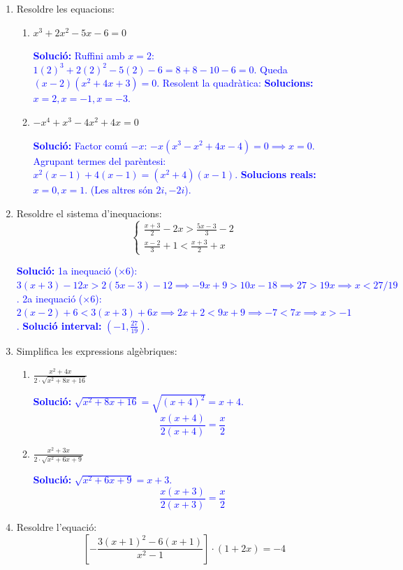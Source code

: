 \documentclass[12pt,a4paper]{article}
\newcommand{\solucio}[1]{%
    \par\vspace{5pt}\noindent\textcolor{blue}{\textbf{Solució:} #1}\par\vspace{10pt}%
}
\begin{document}
\begin{enumerate}[label=\textbf{\arabic*.}]
    \item Resoldre les equacions:
    \begin{enumerate}[label=\alph*)]
        \item $x^{3}+2x^{2}-5x-6=0$
        \solucio{
        Ruffini amb $x=2$: $1(2)^3 + 2(2)^2 - 5(2) - 6 = 8+8-10-6=0$.
        Queda $(x-2)(x^2+4x+3)=0$. Resolent la quadràtica:
        \textbf{Solucions:} $x=2, x=-1, x=-3$.
        }
        
        \item $-x^{4}+x^{3}-4x^{2}+4x=0$
        \solucio{
        Factor comú $-x$: $-x(x^3 - x^2 + 4x - 4) = 0 \implies x=0$.
        Agrupant termes del parèntesi: $x^2(x-1) + 4(x-1) = (x^2+4)(x-1)$.
        \textbf{Solucions reals:} $x=0, x=1$. (Les altres són $2i, -2i$).
        }
    \end{enumerate}

    \item Resoldre el sistema d'inequacions:
    \[ \begin{cases} \frac{x+3}{2}-2x > \frac{5x-3}{3}-2 \\ \frac{x-2}{3}+1 < \frac{x+3}{2}+x \end{cases} \]
    
    \solucio{
    1a inequació ($\times 6$): $3(x+3) - 12x > 2(5x-3) - 12 \implies -9x + 9 > 10x - 18 \implies 27 > 19x \implies x < 27/19$.
    \newline
    2a inequació ($\times 6$): $2(x-2) + 6 < 3(x+3) + 6x \implies 2x + 2 < 9x + 9 \implies -7 < 7x \implies x > -1$.
    \textbf{Solució interval:} $(-1, \frac{27}{19})$.
    }

    \item Simplifica les expressions algèbriques:
    \begin{enumerate}[label=\alph*)]
        \item $\displaystyle \frac{x^{2}+4x}{2\cdot\sqrt{x^{2}+8x+16}}$
        \solucio{
        $\sqrt{x^2+8x+16} = \sqrt{(x+4)^2} = x+4$.
        \[ \frac{x(x+4)}{2(x+4)} = \boxed{\frac{x}{2}} \]
        }

        \item $\displaystyle \frac{x^{2}+3x}{2\cdot\sqrt{x^{2}+6x+9}}$
        \solucio{
        $\sqrt{x^2+6x+9} = x+3$.
        \[ \frac{x(x+3)}{2(x+3)} = \boxed{\frac{x}{2}} \]
        }
    \end{enumerate}

    \item Resoldre l'equació:
    \[ \left[-\frac{3(x+1)^{2}-6(x+1)}{x^{2}-1}\right]\cdot(1+2x)=-4 \]
    

\end{enumerate}
\end{document}
